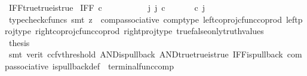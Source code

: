 \begin{isabellebody}
\ IFF{\isacharunderscore}{\kern0pt}true{\isacharunderscore}{\kern0pt}true{\isacharunderscore}{\kern0pt}is{\isacharunderscore}{\kern0pt}true{\isacharcolon}{\kern0pt}\isanewline
\ {\isachardoublequoteopen}IFF\ {\isasymcirc}\isactrlsub c\ {\isasymlangle}{\isasymt}{\isacharcomma}{\kern0pt}{\isasymt}{\isasymrangle}\ {\isacharequal}{\kern0pt}\ {\isasymt}{\isachardoublequoteclose}\isanewline
%
\isadelimproof
%
\endisadelimproof
%
\isatagproof
{}\isamarkupfalse%
\ {\isacharminus}{\kern0pt}\ \isanewline
\ \ \isamarkupfalse%
\ {\isachardoublequoteopen}{\isasymexists}\ j{\isachardot}{\kern0pt}\ j\ {\isasymin}\isactrlsub c\ {\isacharparenleft}{\kern0pt}{\isasymone}{\isasymCoprod}{\isasymone}{\isacharparenright}{\kern0pt}\ {\isasymand}\ {\isacharparenleft}{\kern0pt}{\isasymlangle}{\isasymt}{\isacharcomma}{\kern0pt}\ {\isasymt}{\isasymrangle}\ {\isasymamalg}{\isasymlangle}{\isasymf}{\isacharcomma}{\kern0pt}\ {\isasymf}{\isasymrangle}{\isacharparenright}{\kern0pt}\ {\isasymcirc}\isactrlsub c\ j\ \ {\isacharequal}{\kern0pt}\ {\isasymlangle}{\isasymt}{\isacharcomma}{\kern0pt}{\isasymt}{\isasymrangle}{\isachardoublequoteclose}\isanewline
\ \ \ \ \isamarkupfalse%
\ {\isacharparenleft}{\kern0pt}typecheck{\isacharunderscore}{\kern0pt}cfuncs{\isacharcomma}{\kern0pt}\ smt\ {\isacharparenleft}{\kern0pt}z{}{\isacharparenright}{\kern0pt}\ \ comp{\isacharunderscore}{\kern0pt}associative{}\ comp{\isacharunderscore}{\kern0pt}type\ left{\isacharunderscore}{\kern0pt}coproj{\isacharunderscore}{\kern0pt}cfunc{\isacharunderscore}{\kern0pt}coprod\ left{\isacharunderscore}{\kern0pt}proj{\isacharunderscore}{\kern0pt}type\ right{\isacharunderscore}{\kern0pt}coproj{\isacharunderscore}{\kern0pt}cfunc{\isacharunderscore}{\kern0pt}coprod\ right{\isacharunderscore}{\kern0pt}proj{\isacharunderscore}{\kern0pt}type\ true{\isacharunderscore}{\kern0pt}false{\isacharunderscore}{\kern0pt}only{\isacharunderscore}{\kern0pt}truth{\isacharunderscore}{\kern0pt}values{\isacharparenright}{\kern0pt}\isanewline
\ \ \isamarkupfalse%
\ \isamarkupfalse%
\ {\isacharquery}{\kern0pt}thesis\ \isanewline
\ \ \ \ \isamarkupfalse%
\ {\isacharparenleft}{\kern0pt}smt\ {\isacharparenleft}{\kern0pt}verit{\isacharcomma}{\kern0pt}\ ccfv{\isacharunderscore}{\kern0pt}threshold{\isacharparenright}{\kern0pt}\ AND{\isacharunderscore}{\kern0pt}is{\isacharunderscore}{\kern0pt}pullback\ AND{\isacharunderscore}{\kern0pt}true{\isacharunderscore}{\kern0pt}true{\isacharunderscore}{\kern0pt}is{\isacharunderscore}{\kern0pt}true\ IFF{\isacharunderscore}{\kern0pt}is{\isacharunderscore}{\kern0pt}pullback\ comp{\isacharunderscore}{\kern0pt}associative{}\ is{\isacharunderscore}{\kern0pt}pullback{\isacharunderscore}{\kern0pt}def\ \ terminal{\isacharunderscore}{\kern0pt}func{\isacharunderscore}{\kern0pt}comp{\isacharparenright}{\kern0pt}\isanewline

\end{isabellebody}
